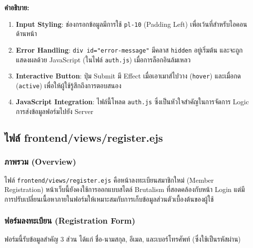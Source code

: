 \textbf{คำอธิบาย:}
\begin{enumerate}
    \item \textbf{Input Styling}: ช่องกรอกข้อมูลมีการใช้ \texttt{pl-10} (Padding Left) เพื่อเว้นที่สำหรับไอคอนด้านหน้า
    \item \textbf{Error Handling}: \texttt{div id="error-message"} มีคลาส \texttt{hidden} อยู่เริ่มต้น และจะถูกแสดงผลด้วย JavaScript (ในไฟล์ \texttt{auth.js}) เมื่อการล็อกอินล้มเหลว
    \item \textbf{Interactive Button}: ปุ่ม Submit มี Effect เมื่อเอาเมาส์ไปวาง (\texttt{hover}) และเมื่อกด (\texttt{active}) เพื่อให้ผู้ใช้รู้สึกถึงการตอบสนอง
    \item \textbf{JavaScript Integration}: ไฟล์นี้โหลด \texttt{auth.js} ซึ่งเป็นหัวใจสำคัญในการจัดการ Logic การส่งข้อมูลฟอร์มไปยัง Server
\end{enumerate}


\subsection{ไฟล์ frontend/views/register.ejs}

\subsubsection{ภาพรวม (Overview)}
\begin{sloppypar}
ไฟล์ \texttt{frontend/views/register.ejs} คือหน้าลงทะเบียนสมาชิกใหม่ (Member Registration) หน้าเว็บนี้ยังคงใช้การออกแบบสไตล์ Brutalism ที่สอดคล้องกับหน้า Login แต่มีการปรับเปลี่ยนเนื้อหาภายในฟอร์มให้เหมาะสมกับการเก็บข้อมูลส่วนตัวเบื้องต้นของผู้ใช้
\end{sloppypar}

\subsubsection{ฟอร์มลงทะเบียน (Registration Form)}
ฟอร์มนี้รับข้อมูลสำคัญ 3 ส่วน ได้แก่ ชื่อ-นามสกุล, อีเมล, และเบอร์โทรศัพท์ (ซึ่งใช้เป็นรหัสผ่าน)

